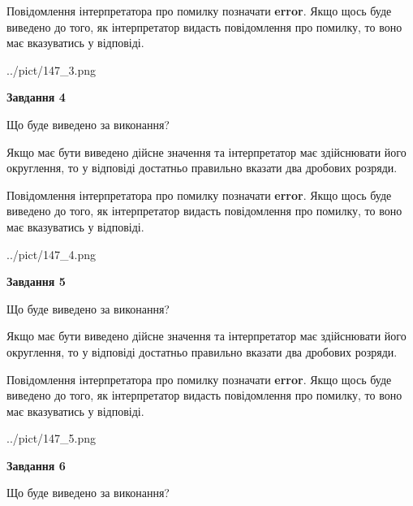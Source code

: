 \documentclass[12pt, ukrainian]{article}
\begin{document}
{\begin {Large}
Повідомлення інтерпретатора про помилку позначати \textbf{error}.
Якщо щось буде виведено до того, як інтерпретатор видасть повідомлення про помилку, 
то воно має вказуватись у відповіді. \par

\begin{center}
	{../pict/147_3.png}
\end{center}
\newpage

{\begin {center}\textbf{Завдання 4}\end {center}}\par
Що буде виведено за виконання? \par

Якщо має бути виведено дійсне значення та інтерпретатор має здійснювати його округлення, 
то у відповіді достатньо правильно вказати два дробових розряди.

Повідомлення інтерпретатора про помилку позначати \textbf{error}.
Якщо щось буде виведено до того, як інтерпретатор видасть повідомлення про помилку, 
то воно має вказуватись у відповіді. \par

\begin{center}
	{../pict/147_4.png}
\end{center}
\newpage

{\begin {center}\textbf{Завдання 5}\end {center}}\par
Що буде виведено за виконання? \par

Якщо має бути виведено дійсне значення та інтерпретатор має здійснювати його округлення, 
то у відповіді достатньо правильно вказати два дробових розряди.

Повідомлення інтерпретатора про помилку позначати \textbf{error}.
Якщо щось буде виведено до того, як інтерпретатор видасть повідомлення про помилку, 
то воно має вказуватись у відповіді. \par

\begin{center}
	{../pict/147_5.png}
\end{center}
\newpage

{\begin {center}\textbf{Завдання 6}\end {center}}\par
Що буде виведено за виконання? \par


\end{Large}}
\end{document}
